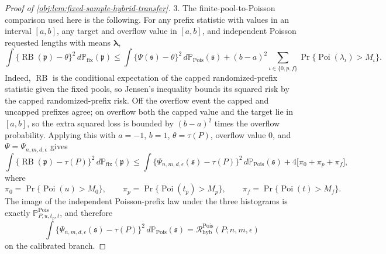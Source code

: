 \documentclass[11pt]{article}
\begin{document}
\begin{proof}[Proof of \cref{obj:lem:fixed-sample-hybrid-transfer}]
3. The finite-pool-to-Poisson comparison used here is the following.  For any prefix statistic with values in an interval \([a,b]\), any target and overflow value in \([a,b]\), and independent Poisson requested lengths with means \(\boldsymbol\lambda\),
\[
\int
\bigl\{\operatorname{RB}(\mathfrak p)-\theta\bigr\}^2
\,d\mathbb P_{\mathrm{fix}}(\mathfrak p)
\le
\int
\bigl\{\Psi(\mathfrak s)-\theta\bigr\}^2
\,d\mathbb P_{\mathrm{Pois}}(\mathfrak s)
+
(b-a)^2
\sum_{\iota\in\{0,p,f\}}
\Pr\{\operatorname{Poi}(\lambda_\iota)>M_\iota\}.
\]
Indeed, \(\operatorname{RB}\) is the conditional expectation of the capped randomized-prefix statistic given the fixed pools, so Jensen's inequality bounds its squared risk by the capped randomized-prefix risk.  Off the overflow event the capped and uncapped prefixes agree; on overflow both the capped value and the target lie in \([a,b]\), so the extra squared loss is bounded by \((b-a)^2\) times the overflow probability.  Applying this with \(a=-1\), \(b=1\), \(\theta=\tau(P)\), overflow value \(0\), and \(\Psi=\Psi_{n,m,d,\epsilon}\) gives
\[
\int
\bigl\{\operatorname{RB}(\mathfrak p)-\tau(P)\bigr\}^2
\,d\mathbb P_{\mathrm{fix}}(\mathfrak p)
\le
\int
\bigl\{\Psi_{n,m,d,\epsilon}(\mathfrak s)-\tau(P)\bigr\}^2
\,d\mathbb P_{\mathrm{Pois}}(\mathfrak s)
+
4\bigl[
\pi_0+\pi_p+\pi_f
\bigr],
\]
where
\[
\pi_0=\Pr\{\operatorname{Poi}(u)>M_0\},\qquad
\pi_p=\Pr\{\operatorname{Poi}(t_p)>M_p\},\qquad
\pi_f=\Pr\{\operatorname{Poi}(t)>M_f\}.
\]
The image of the independent Poisson-prefix law under the three histograms is exactly
\(\mathbb P^{\mathrm{Pois}}_{P,u,t_p,t}\), and therefore
\[
\int
\bigl\{\Psi_{n,m,d,\epsilon}(\mathfrak s)-\tau(P)\bigr\}^2
\,d\mathbb P_{\mathrm{Pois}}(\mathfrak s)
=
\mathcal R^{\mathrm{Pois}}_{\mathrm{hyb}}(P;n,m,\epsilon)
\]
on the calibrated branch. %


\end{proof}
\end{document}
